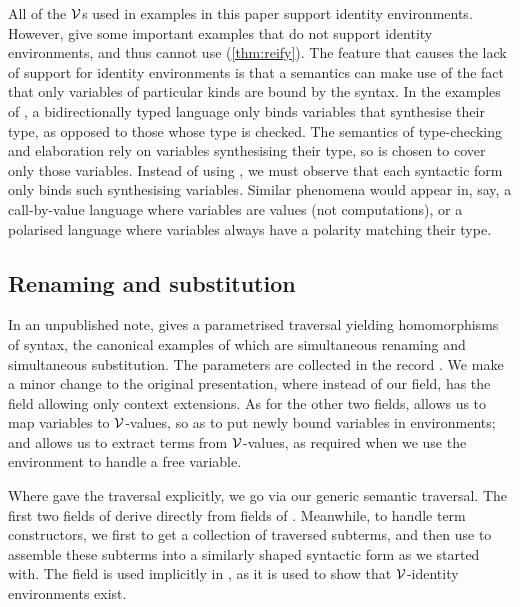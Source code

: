 All of the $\V$s used in examples in this paper support identity environments.
However, \citet[p.~27]{AACMM21} give some important examples that do not
support identity environments, and thus cannot use 
(\cref{thm:reify}).
The feature that causes the lack of support for identity environments is that
a semantics can make use of the fact that only variables of particular kinds
are bound by the syntax.
In the examples of \citeauthor{AACMM21}, a bidirectionally typed language only
binds variables that synthesise their type, as opposed to those whose type is
checked.
The semantics of type-checking and elaboration rely on variables synthesising
their type, so \AgdaBound{$\V$} is chosen to cover only those variables.
Instead of using , we must observe that each syntactic form
only binds such synthesising variables.
Similar phenomena would appear in, say, a call-by-value language where
variables are values (not computations), or a polarised language where
variables always have a polarity matching their type.


\subsection{Renaming and substitution}\label{sec:kit-to-sem}

In an unpublished note, \citet{McBride05} gives a parametrised traversal
yielding homomorphisms of syntax, the canonical examples of which are
simultaneous renaming and simultaneous substitution.
The parameters are collected in the record .
We make a minor change to the original presentation, where instead of our
 field, \citeauthor{McBride05} has the
field  allowing only context extensions.
As for the other two fields,  allows us to map variables to
$\V$-values, so as to put newly bound variables in environments; and
 allows us to extract terms from $\V$-values, as required when
we use the environment to handle a free variable.


Where \citeauthor{McBride05} gave the traversal explicitly, we go via our
generic semantic traversal.
The first two fields of  derive directly from fields of
.
Meanwhile, to handle term constructors, we first  to get a
collection of traversed subterms, and then use 
to assemble these subterms into a similarly shaped syntactic form as we started
with.
The  field is used implicitly in , as it is
used to show that $\V$-identity environments exist.

